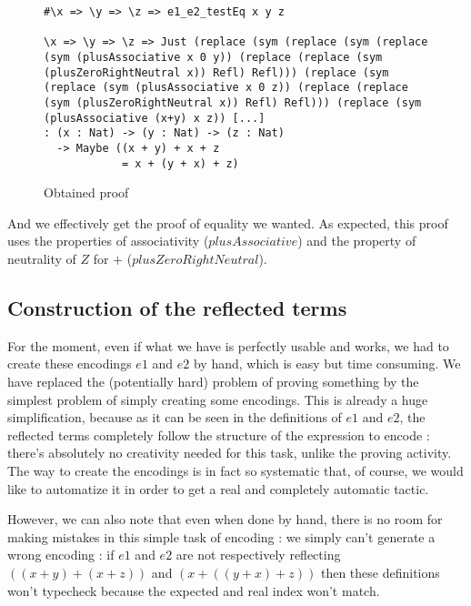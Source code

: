\begin{figure}[H]
\figrule
\begin{center}
\begin{lstlisting}
#\x => \y => \z => e1_e2_testEq x y z

\x => \y => \z => Just (replace (sym (replace (sym (replace 
(sym (plusAssociative x 0 y)) (replace (replace (sym 
(plusZeroRightNeutral x)) Refl) Refl))) (replace (sym 
(replace (sym (plusAssociative x 0 z)) (replace (replace 
(sym (plusZeroRightNeutral x)) Refl) Refl))) (replace (sym 
(plusAssociative (x+y) x z)) [...]
: (x : Nat) -> (y : Nat) -> (z : Nat) 
  -> Maybe ((x + y) + x + z 
            = x + (y + x) + z)
\end{lstlisting}
\end{center}
\caption{Obtained proof}
\label{obtainedProof}
\figrule
\end{figure}

And we effectively get the proof of equality we wanted. As expected, this proof uses the properties of associativity ($plusAssociative$) and the property of neutrality of $Z$ for $+$ ($plusZeroRightNeutral$).


\subsection{Construction of the reflected terms}
\label{sect:ReflectNat}

For the moment, even if what we have is perfectly usable and works, we had to create these encodings $e1$ and $e2$ by hand, which is easy but time consuming. We have replaced the (potentially hard) problem of proving something by the simplest problem of simply creating some encodings. This is already a huge simplification, because as it can be seen in the definitions of $e1$ and $e2$, the reflected terms completely follow the structure of the expression to encode : there's absolutely no creativity needed for this task, unlike the proving activity. The way to create the encodings is in fact so systematic that, of course, we would like to automatize it in order to get a real and completely automatic tactic.

However, we can also note that even when done by hand, there is no room for making mistakes in this simple task of encoding : we simply can't generate a wrong encoding : if $e1$ and $e2$ are not respectively reflecting $((x+y) + (x+z))$ and $(x + ((y + x) + z))$ then these definitions won't typecheck because the expected and real index won't match.


